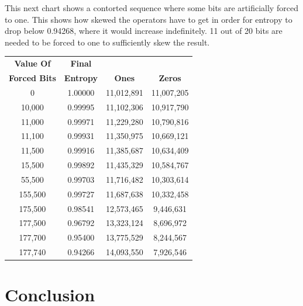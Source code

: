 \documentclass[preprint,natbib]{sigplanconf}
\begin{document}
This next chart shows a contorted sequence where some bits are artificially forced to one. This shows how skewed the operators have to get in order for entropy to drop below 0.94268, where it would increase indefinitely. 11 out of 20 bits are needed to be forced to one to sufficiently skew the result.

\noindent
\begin{minipage}{\columnwidth}
    \setlength{\tabcolsep}{.35\tabcolsep}
    \centering
    \begin{tabular}{|c|c|c|c|}
        \hline
        \textbf{Value Of}    & \textbf{Final}   &               &                \\
        \textbf{Forced Bits} & \textbf{Entropy} & \textbf{Ones} & \textbf{Zeros} \\
        \hline
        0                    & 1.00000          & 11,012,891    & 11,007,205     \\
        10,000               & 0.99995          & 11,102,306    & 10,917,790     \\
        11,000               & 0.99971          & 11,229,280    & 10,790,816     \\
        11,100               & 0.99931          & 11,350,975    & 10,669,121     \\
        11,500               & 0.99916          & 11,385,687    & 10,634,409     \\
        15,500               & 0.99892          & 11,435,329    & 10,584,767     \\
        55,500               & 0.99703          & 11,716,482    & 10,303,614     \\
        155,500              & 0.99727          & 11,687,638    & 10,332,458     \\
        175,500              & 0.98541          & 12,573,465    & 9,446,631      \\
        177,500              & 0.96792          & 13,323,124    & 8,696,972      \\
        177,700              & 0.95400          & 13,775,529    & 8,244,567      \\
        177,740              & 0.94266          & 14,093,550    & 7,926,546      \\
        \hline
    \end{tabular}
\end{minipage}

\section{Conclusion}
\end{document}
